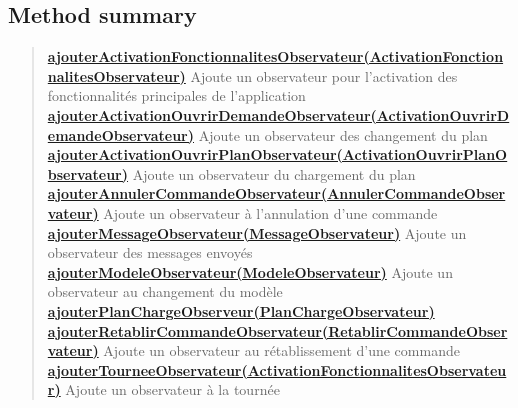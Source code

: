 \documentclass[11pt,a4paper]{report}
\begin{document}
{{{\subsection{Method summary}{
\begin{verse}
\hyperlink{controleur.ControleurInterface.ajouterActivationFonctionnalitesObservateur(controleur.observateur.ActivationFonctionnalitesObservateur)}{{\bf ajouterActivationFonctionnalitesObservateur(ActivationFonctionnalitesObservateur)}} Ajoute un observateur pour l'activation des fonctionnalités principales de l'application\\
\hyperlink{controleur.ControleurInterface.ajouterActivationOuvrirDemandeObservateur(controleur.observateur.ActivationOuvrirDemandeObservateur)}{{\bf ajouterActivationOuvrirDemandeObservateur(ActivationOuvrirDemandeObservateur)}} Ajoute un observateur des changement du plan\\
\hyperlink{controleur.ControleurInterface.ajouterActivationOuvrirPlanObservateur(controleur.observateur.ActivationOuvrirPlanObservateur)}{{\bf ajouterActivationOuvrirPlanObservateur(ActivationOuvrirPlanObservateur)}} Ajoute un observateur du chargement du plan\\
\hyperlink{controleur.ControleurInterface.ajouterAnnulerCommandeObservateur(controleur.observateur.AnnulerCommandeObservateur)}{{\bf ajouterAnnulerCommandeObservateur(AnnulerCommandeObservateur)}} Ajoute un observateur à l'annulation d'une commande\\
\hyperlink{controleur.ControleurInterface.ajouterMessageObservateur(controleur.observateur.MessageObservateur)}{{\bf ajouterMessageObservateur(MessageObservateur)}} Ajoute un observateur des messages envoyés\\
\hyperlink{controleur.ControleurInterface.ajouterModeleObservateur(controleur.observateur.ModeleObservateur)}{{\bf ajouterModeleObservateur(ModeleObservateur)}} Ajoute un observateur au changement du modèle\\
\hyperlink{controleur.ControleurInterface.ajouterPlanChargeObserveur(controleur.observateur.PlanChargeObservateur)}{{\bf ajouterPlanChargeObserveur(PlanChargeObservateur)}} \\
\hyperlink{controleur.ControleurInterface.ajouterRetablirCommandeObservateur(controleur.observateur.RetablirCommandeObservateur)}{{\bf ajouterRetablirCommandeObservateur(RetablirCommandeObservateur)}} Ajoute un observateur au rétablissement d'une commande\\
\hyperlink{controleur.ControleurInterface.ajouterTourneeObservateur(controleur.observateur.ActivationFonctionnalitesObservateur)}{{\bf ajouterTourneeObservateur(ActivationFonctionnalitesObservateur)}} Ajoute un observateur à la tournée\\

\end{verse}}}}}
\end{document}
